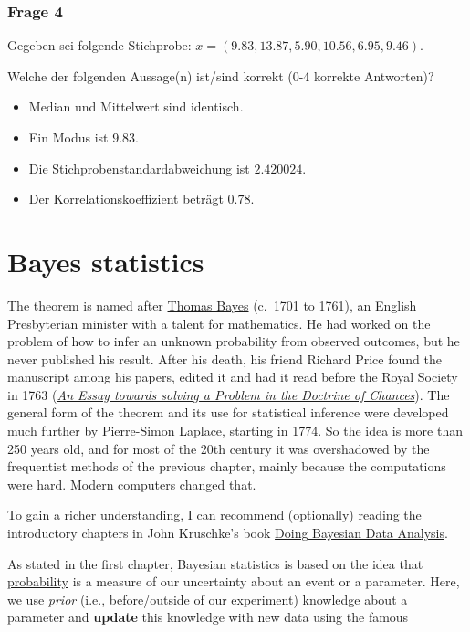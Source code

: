 \documentclass[
]{book}
\providecommand{\tightlist}{%
  \setlength{\itemsep}{0pt}\setlength{\parskip}{0pt}}
\begin{document}
\subsection{Frage 4}\label{frage-4}

Gegeben sei folgende Stichprobe: \(x = (9.83, 13.87, 5.90, 10.56,  6.95, 9.46)\).

Welche der folgenden Aussage(n) ist/sind korrekt (0-4 korrekte Antworten)?

\begin{itemize}
\tightlist
\item
  Median und Mittelwert sind identisch.
\item
  Ein Modus ist \(9.83\).
\item
  Die Stichprobenstandardabweichung ist \(2.420024\).
\item
  Der Korrelationskoeffizient beträgt \(0.78\).
\end{itemize}

\chapter{Bayes statistics}\label{bayes_statistics}

The theorem is named after \href{https://en.wikipedia.org/wiki/Thomas_Bayes}{Thomas Bayes} (c.~1701 to 1761),
an English Presbyterian minister with a talent for mathematics. He had worked on the problem of how to infer
an unknown probability from observed outcomes, but he never published his result. After his death, his friend
Richard Price found the manuscript among his papers, edited it and had it read before the Royal Society in 1763
(\href{https://en.wikipedia.org/wiki/An_Essay_Towards_Solving_a_Problem_in_the_Doctrine_of_Chances}{\emph{An Essay towards solving a Problem in the Doctrine of Chances}}).
The general form of the theorem and its use for statistical inference were developed much further by
Pierre-Simon Laplace, starting in 1774. So the idea is more than 250 years old, and for most of the 20th century
it was overshadowed by the frequentist methods of the previous chapter, mainly because the computations were hard.
Modern computers changed that.

To gain a richer understanding, I can recommend (optionally) reading the introductory chapters in
John Kruschke's book \href{https://nyu-cdsc.github.io/learningr/assets/kruschke_bayesian_in_R.pdf}{Doing Bayesian Data Analysis}.

As stated in the first chapter, Bayesian statistics is based on the idea that
\href{https://en.wikipedia.org/wiki/Bayesian_probability}{probability} is a measure of our uncertainty about an event or a parameter.
Here, we use \emph{prior} (i.e., before/outside of our experiment) knowledge
about a parameter and \textbf{update} this knowledge with new data using the
famous
\end{document}
